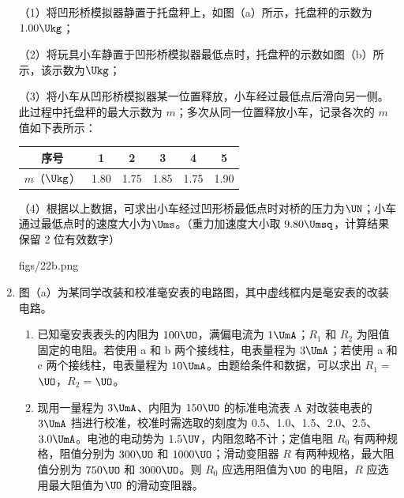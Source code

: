 \documentclass[\gkver]{gaokaozhenti}
\begin{document}
\begin{enumerate}
（1）将凹形桥模拟器静置于托盘秤上，如图（a）所示，托盘秤的示数为 $1.00\Ukg$；

（2）将玩具小车静置于凹形桥模拟器最低点时，托盘秤的示数如图（b）所示，该示数为$\Ukg$；

（3）将小车从凹形桥模拟器某一位置释放，小车经过最低点后滑向另一侧。此过程中托盘秤的最大示数为 $m$；多次从同一位置释放小车，记录各次的 $m$ 值如下表所示：

\begin{center}
\begin{tabular}{|c|c|c|c|c|c|}
\hline
序号 & 1 & 2 & 3 & 4 & 5 \\
\hline
$m$（$\Ukg$） & 1.80 & 1.75 & 1.85 & 1.75 & 1.90 \\
\hline
\end{tabular}
\end{center}

（4）根据以上数据，可求出小车经过凹形桥最低点时对桥的压力为$\UN$；小车通过最低点时的速度大小为$\Ums$。（重力加速度大小取 $9.80\Umsq$，计算结果保留 2 位有效数字）

{figs/22b.png}


\item
图（a）为某同学改装和校准毫安表的电路图，其中虚线框内是毫安表的改装电路。

\begin{enumerate}
	\item
	已知毫安表表头的内阻为 $100\UO$，满偏电流为 $1\UmA$；$R_{1}$ 和 $R_{2}$ 为阻值固定的电阻。若使用 a 和 b 两个接线柱，电表量程为 $3\UmA$；若使用 a 和 c 两个接线柱，电表量程为 $10\UmA$。由题给条件和数据，可以求出 $R_{1}=$$\UO$，$R_{2}=$$\UO$。

	\item
	现用一量程为 $3\UmA$、内阻为 $150\UO$ 的标准电流表 A 对改装电表的 $3\UmA$ 挡进行校准，校准时需选取的刻度为 0.5、1.0、1.5、2.0、2.5、$3.0\UmA$。电池的电动势为 $1.5\UV$，内阻忽略不计；定值电阻 $R_{0}$ 有两种规格，阻值分别为 $300\UO$ 和 $1000\UO$；滑动变阻器 $R$ 有两种规格，最大阻值分别为 $750\UO$ 和 $3000\UO$。则 $R_{0}$ 应选用阻值为$\UO$ 的电阻，$R$ 应选用最大阻值为$\UO$ 的滑动变阻器。


\end{enumerate}
\end{enumerate}
\end{document}
